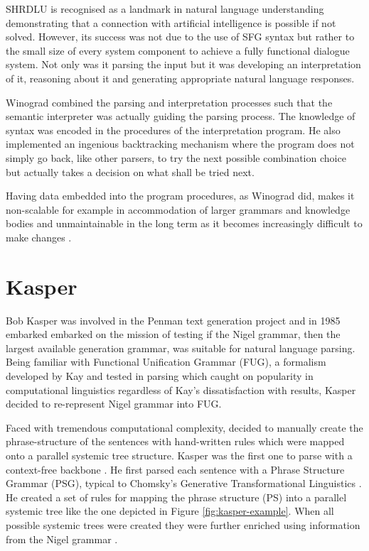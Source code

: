 SHRDLU is recognised as a landmark in natural language understanding demonstrating that a connection with artificial intelligence is possible if not solved. However, its success was not due to the use of SFG syntax but rather to the small size of every system component to achieve a fully functional dialogue system. Not only was it parsing the input but it was developing an interpretation of it, reasoning about it and generating appropriate natural language responses. 

Winograd combined the parsing and interpretation processes such that the semantic interpreter was actually guiding the parsing process. The knowledge of syntax was encoded in the procedures of the interpretation program. He also implemented an ingenious backtracking mechanism where the program does not simply go back, like other parsers, to try the next possible combination choice but actually takes a decision on what shall be tried next.  

Having data embedded into the program procedures, as Winograd did, makes it non-scalable for example in accommodation of larger grammars and knowledge bodies and unmaintainable in the long term as it becomes increasingly difficult to make changes \citep{Weerasinghe1994}.

\section{Kasper}
Bob Kasper was involved in the Penman text generation project and in 1985 embarked embarked on the mission of testing if the Nigel grammar, then the largest available generation grammar, was suitable for natural language parsing. Being familiar with Functional Unification Grammar (FUG), a formalism developed by Kay and tested in parsing \citep{Kay1985} which caught on popularity in computational linguistics regardless of Kay's dissatisfaction with results, Kasper decided to re-represent Nigel grammar into FUG. 

Faced with tremendous computational complexity, \citet{Kasper1988} decided to manually create the phrase-structure of the sentences with hand-written rules which were mapped onto a parallel systemic tree structure. Kasper was the first one to parse with a context-free backbone \citep{Kasper1988}. He first parsed each sentence with a Phrase Structure Grammar (PSG), typical to Chomsky's Generative Transformational Linguistics \citep{Chomsky1957}. He created a set of rules for mapping the phrase structure (PS) into a parallel systemic tree like the one depicted in Figure \ref{fig:kasper-example}. When all possible systemic trees were created they were further enriched using information from the Nigel grammar \citep{Matthiessen1985}.


